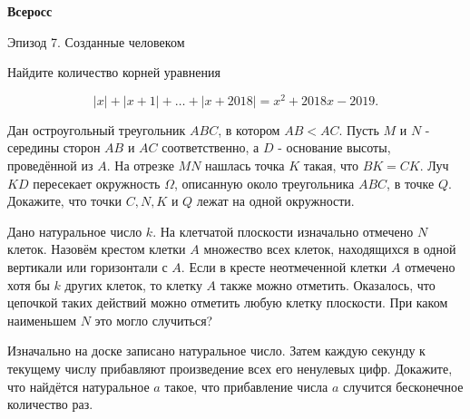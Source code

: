 \centerline{\bf \Huge Всеросс}

\begin{flushright}
        \scriptsize{Эпизод 7. Созданные человеком}
\end{flushright}


Найдите количество корней уравнения

$$
|x|+|x+1|+\ldots+|x+2018|=x^2+2018 x-2019 .
$$


Дан остроугольный треугольник $A B C$, в котором $A B<A C$. Пусть $M$ и $N$ - середины сторон $A B$ и $A C$ соответственно, а $D$ - основание высоты, проведённой из $A$. На отрезке $M N$ нашлась точка $K$ такая, что $B K=C K$. Луч $K D$ пересекает окружность $\Omega$, описанную около треугольника $A B C$, в точке $Q$. Докажите, что точки $C, N, K$ и $Q$ лежат на одной окружности.

Дано натуральное число $k$. На клетчатой плоскости изначально отмечено $N$ клеток. Назовём крестом клетки $A$ множество всех клеток, находящихся в одной вертикали или горизонтали с $A$. Если в кресте неотмеченной клетки $A$ отмечено хотя бы $k$ других клеток, то клетку $A$ также можно отметить. Оказалось, что цепочкой таких действий можно отметить любую клетку плоскости. При каком наименьшем $N$ это могло случиться?

Изначально на доске записано натуральное число. Затем каждую секунду к текущему числу прибавляют произведение всех его ненулевых цифр. Докажите, что найдётся натуральное $a$ такое, что прибавление числа $a$ случится бесконечное количество раз.
